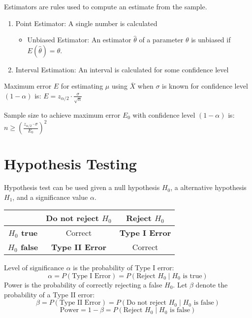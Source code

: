 \documentclass[12pt, a4paper]{article}
\begin{document}
\begin{multicols*}{3}
Estimators are rules used to compute an estimate from the sample.
\begin{enumerate}[\roman*.]
  \item Point Estimator: A single number is calculated
    \begin{itemize}\vspace{2pt}
    \item Unbiased Estimator: An estimator $\hat{\theta}$ of a parameter $\theta$ is unbiased if $E(\hat{\theta}) = \theta$.
    \end{itemize}
  \item Interval Estimation: An interval is calculated for some confidence level
\end{enumerate}

Maximum error $E$ for estimating $\mu$ using $\bar{X}$ when $\sigma$ is known for confidence level $(1-\alpha)$ is: $E = z_{\alpha/2} \cdot \frac{\sigma}{\sqrt{n}}$

Sample size to achieve maximum error $E_0$ with confidence level $(1 - \alpha)$ is: $n \geq \left( \frac{z_{\alpha/2} \cdot \sigma}{E_0} \right)^2$

\section{Hypothesis Testing}

Hypothesis test can be used given a null hypothesis $H_0$, a alternative hypothesis $H_1$, and a significance value $\alpha$.

\begin{center}
\begin{tabular}{|c|c|c|}
\hline
 & \textbf{Do not reject \( H_0 \)} & \textbf{Reject \( H_0 \)} \\
\hline
\textbf{\( H_0 \) true} & Correct & \textbf{Type I Error} \\
\hline
\textbf{\( H_0 \) false} & \textbf{Type II Error} & Correct \\
\hline
\end{tabular}
\end{center}

Level of significance $\alpha$ is the probability of Type I error:
\[
\alpha = P(\text{Type I Error}) = P(\text{Reject } H_0 \mid H_0 \text{ is true})
\]
Power is the probability of correctly rejecting a false $H_0$. Let \( \beta \) denote the probability of a Type II error:
\[
\beta = P(\text{Type II Error}) = P(\text{Do not reject } H_0 \mid H_0 \text{ is false})
\]
\[
\text{Power} = 1 - \beta = P(\text{Reject } H_0 \mid H_0 \text{ is false})
\]


\end{multicols*}
\end{document}
